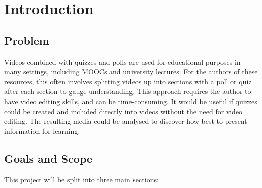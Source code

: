 \chapter{Introduction}
\label{Chapter:Introduction}

\begin{preamble}
\end{preamble}

\section{Problem}
\label{Section:Problem}

Videos combined with quizzes and polls are used for educational purposes in many settings, including \glspl{MOOC} and university lectures. For the authors of these resources, this often involves splitting videos up into sections with a poll or quiz after each section to gauge understanding. This approach requires the author to have video editing skills, and can be time-consuming. It would be useful if quizzes could be created and included directly into videos without the need for video editing. The resulting media could be analysed to discover how best to present information for learning.

\section{Goals and Scope}
\label{Section:Goals and Scope}

This project will be split into three main sections:

